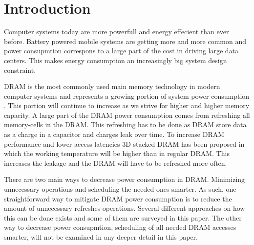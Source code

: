 \section{Introduction}
\label{sec:int}
Computer systems today are more powerfull and energy effecient than ever before. Battery powered mobile systems are getting more and more common and power consupmtion correspons to a large part of the cost in driving large data centers. This makes energy consumption an increasingly big system design constraint.

DRAM is the most commonly used main memory technology in modern computer systems and represents a growing portion of system power consumption \cite{exascale}. This portion will continue to increase as we strive for higher and higher memory capacity. A large part of the DRAM power consumption comes from refreshing all memory-cells in the DRAM. This refreshing has to be done as DRAM store data as a charge in a capacitor and charges leak over time. To increase DRAM performance and lower access latencies 3D stacked DRAM has been proposed in which the working temperature will be higher than in regular DRAM. This increases the leakage and the DRAM will have to be refreshed more often.

There are two main ways to decrease power consumption in DRAM. Minimizing unnecessary operations and scheduling the needed ones smarter. As such, one straightforward way to mitigate DRAM power consumption is to reduce the amount of unnecessary refreshes operations. Several different approaches on how this can be done exists and some of them are surveyed in this paper. The other way to decrease power consupmtion, scheduling of all needed DRAM accesses smarter, will not be examined in any deeper detail in this paper.  
